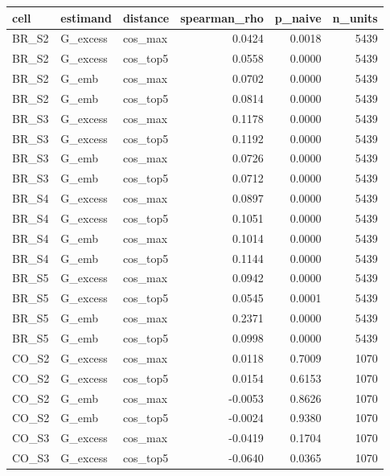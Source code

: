 \begin{tabular}{lllrrr}
\toprule
cell & estimand & distance & spearman\_rho & p\_naive & n\_units \\
\midrule
BR\_S2 & G\_excess & cos\_max & 0.0424 & 0.0018 & 5439 \\
BR\_S2 & G\_excess & cos\_top5 & 0.0558 & 0.0000 & 5439 \\
BR\_S2 & G\_emb & cos\_max & 0.0702 & 0.0000 & 5439 \\
BR\_S2 & G\_emb & cos\_top5 & 0.0814 & 0.0000 & 5439 \\
BR\_S3 & G\_excess & cos\_max & 0.1178 & 0.0000 & 5439 \\
BR\_S3 & G\_excess & cos\_top5 & 0.1192 & 0.0000 & 5439 \\
BR\_S3 & G\_emb & cos\_max & 0.0726 & 0.0000 & 5439 \\
BR\_S3 & G\_emb & cos\_top5 & 0.0712 & 0.0000 & 5439 \\
BR\_S4 & G\_excess & cos\_max & 0.0897 & 0.0000 & 5439 \\
BR\_S4 & G\_excess & cos\_top5 & 0.1051 & 0.0000 & 5439 \\
BR\_S4 & G\_emb & cos\_max & 0.1014 & 0.0000 & 5439 \\
BR\_S4 & G\_emb & cos\_top5 & 0.1144 & 0.0000 & 5439 \\
BR\_S5 & G\_excess & cos\_max & 0.0942 & 0.0000 & 5439 \\
BR\_S5 & G\_excess & cos\_top5 & 0.0545 & 0.0001 & 5439 \\
BR\_S5 & G\_emb & cos\_max & 0.2371 & 0.0000 & 5439 \\
BR\_S5 & G\_emb & cos\_top5 & 0.0998 & 0.0000 & 5439 \\
CO\_S2 & G\_excess & cos\_max & 0.0118 & 0.7009 & 1070 \\
CO\_S2 & G\_excess & cos\_top5 & 0.0154 & 0.6153 & 1070 \\
CO\_S2 & G\_emb & cos\_max & -0.0053 & 0.8626 & 1070 \\
CO\_S2 & G\_emb & cos\_top5 & -0.0024 & 0.9380 & 1070 \\
CO\_S3 & G\_excess & cos\_max & -0.0419 & 0.1704 & 1070 \\
CO\_S3 & G\_excess & cos\_top5 & -0.0640 & 0.0365 & 1070 \\

\end{tabular}
